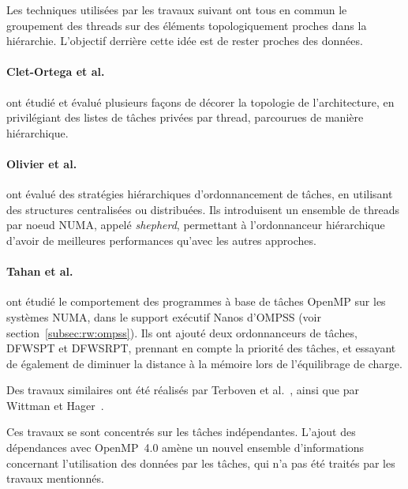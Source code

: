 Les techniques utilisées par les travaux suivant ont tous en commun le groupement des threads sur des éléments topologiquement proches dans la hiérarchie.
L'objectif derrière cette idée est de rester proches des données.


\paragraph{Clet-Ortega et al.~\cite{Clet2014}} ont étudié et évalué plusieurs façons de décorer la topologie de l'architecture, en privilégiant des listes de tâches privées par thread, parcourues de manière hiérarchique.




\paragraph{Olivier et al.~\cite{Olivier2012}} ont évalué des stratégies hiérarchiques d'ordonnancement de tâches, en utilisant des structures centralisées ou distribuées.
Ils introduisent un ensemble de threads par noeud NUMA, appelé \emph{shepherd}, permettant à l'ordonnanceur hiérarchique d'avoir de meilleures performances qu'avec les autres approches.


\paragraph{Tahan et al.~\cite{Tahan2014}} ont étudié le comportement des programmes à base de tâches OpenMP sur les systèmes NUMA, dans le support exécutif Nanos d'OMPSS (voir section~\ref{subsec:rw:ompss}).
Ils ont ajouté deux ordonnanceurs de tâches, DFWSPT et DFWSRPT, prennant en compte la priorité des tâches, et essayant de également de diminuer la distance à la mémoire lors de l'équilibrage de charge.

Des travaux similaires ont été réalisés par Terboven et al.~\cite{Terboven2012}, ainsi que par Wittman et Hager~\cite{Wittmann2011}.

Ces travaux se sont concentrés sur les tâches indépendantes.
L'ajout des dépendances avec OpenMP~4.0 amène un nouvel ensemble d'informations concernant l'utilisation des données par les tâches, qui n'a pas été traités par les travaux mentionnés.

